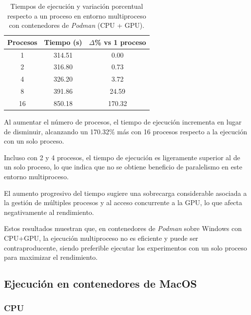 \begin{table}[ht]
    \centering
    \begin{tabular}{|c|c|c|}
        \hline
        \textbf{Procesos} & \textbf{Tiempo (s)} & \textbf{$\Delta$\% vs 1 proceso} \\
        \hline
        1                 & 314.51              & 0.00                             \\
        2                 & 316.80              & 0.73                             \\
        4                 & 326.20              & 3.72                             \\
        8                 & 391.86              & 24.59                            \\
        16                & 850.18              & 170.32                           \\
        \hline
    \end{tabular}
    \caption{Tiempos de ejecución y variación porcentual respecto a un proceso en entorno multiproceso con contenedores de \textit{Podman} (CPU + GPU).}
    \label{tab:multi-node_windows_podman_gpu}
\end{table}

Al aumentar el número de procesos, el tiempo de ejecución incrementa en lugar de disminuir, alcanzando un 170.32\% más con 16 procesos respecto a la ejecución con un solo proceso.

Incluso con 2 y 4 procesos, el tiempo de ejecución es ligeramente superior al de un solo proceso, lo que indica que no se obtiene beneficio de paralelismo en este entorno multiproceso.

El aumento progresivo del tiempo sugiere una sobrecarga considerable asociada a la gestión de múltiples procesos y al acceso concurrente a la GPU, lo que afecta negativamente al rendimiento.

Estos resultados muestran que, en contenedores de \textit{Podman} sobre Windows con CPU+GPU, la ejecución multiproceso no es eficiente y puede ser contraproducente, siendo preferible ejecutar los experimentos con un solo proceso para maximizar el rendimiento.

\subsection{Ejecución en contenedores de MacOS}
\subsubsection{CPU}

